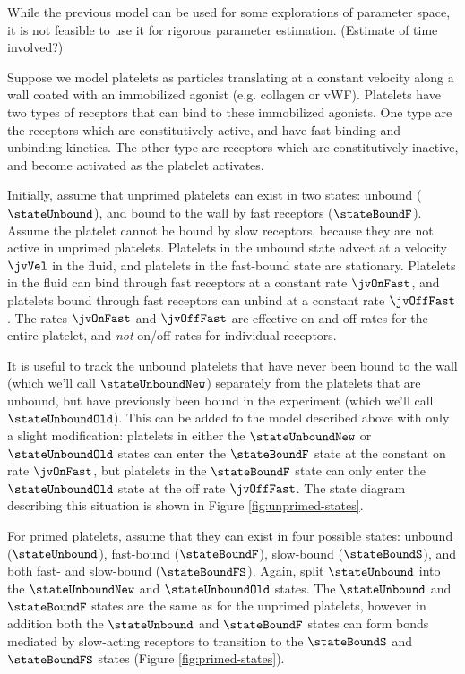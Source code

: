 While the previous model can be used for some explorations of parameter
space, it is not feasible to use it for rigorous parameter
estimation. {\color{red} (Estimate of time involved?)}

Suppose we model platelets as particles translating at a constant
velocity along a wall coated with an immobilized agonist (e.g. collagen
or vWF). Platelets have two types of receptors that can bind to these
immobilized agonists. One type are the receptors which are
constitutively active, and have fast binding and unbinding kinetics. The
other type are receptors which are constitutively inactive, and become
activated as the platelet activates. 

Initially, assume that unprimed platelets can exist in two states:
unbound ($\stateUnbound$), and bound to the wall by fast receptors
($\stateBoundF$). Assume the platelet cannot be bound by slow receptors,
because they are not active in unprimed platelets. Platelets in the
unbound state advect at a velocity $\jvVel$ in the fluid, and platelets
in the fast-bound state are stationary. Platelets in the fluid can bind
through fast receptors at a constant rate $\jvOnFast$, and platelets
bound through fast receptors can unbind at a constant rate
$\jvOffFast$. The rates $\jvOnFast$ and $\jvOffFast$ are effective on
and off rates for the entire platelet, and \emph{not} on/off rates for
individual receptors.

It is useful to track the unbound platelets that have never been bound
to the wall (which we'll call $\stateUnboundNew$) separately from the
platelets that are unbound, but have previously been bound in the
experiment (which we'll call $\stateUnboundOld$). This can be added to
the model described above with only a slight modification: platelets in
either the $\stateUnboundNew$ or $\stateUnboundOld$ states can enter the
$\stateBoundF$ state at the constant on rate $\jvOnFast$, but platelets
in the $\stateBoundF$ state can only enter the $\stateUnboundOld$ state
at the off rate $\jvOffFast$. The state diagram describing this
situation is shown in Figure \ref{fig:unprimed-states}.

For primed platelets, assume that they can exist in four possible
states: unbound ($\stateUnbound$), fast-bound ($\stateBoundF$),
slow-bound ($\stateBoundS$), and both fast- and slow-bound
($\stateBoundFS$). Again, split $\stateUnbound$ into the
$\stateUnboundNew$ and $\stateUnboundOld$ states. The $\stateUnbound$
and $\stateBoundF$ states are the same as for the unprimed platelets,
however in addition both the $\stateUnbound$ and $\stateBoundF$ states
can form bonds mediated by slow-acting receptors to transition to the
$\stateBoundS$ and $\stateBoundFS$ states (Figure
\ref{fig:primed-states}).

